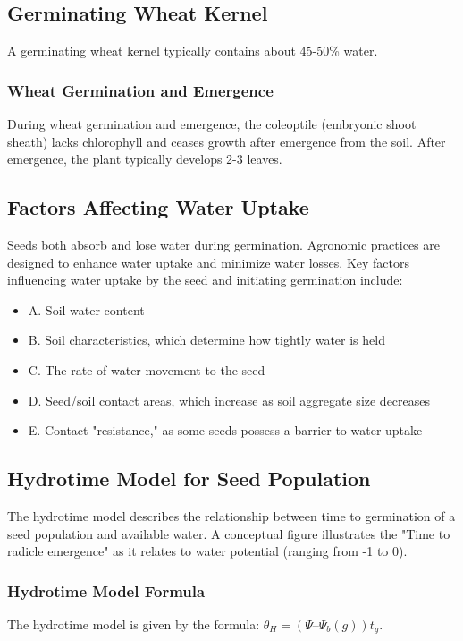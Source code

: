 \subsection{Germinating Wheat Kernel} 
A germinating wheat kernel typically contains about 45-50\% water.

\subsubsection{Wheat Germination and Emergence} 
During wheat germination and emergence, the coleoptile (embryonic shoot sheath) lacks chlorophyll and ceases growth after emergence from the soil. After emergence, the plant typically develops 2-3 leaves.

\subsection{Factors Affecting Water Uptake} 
Seeds both absorb and lose water during germination. Agronomic practices are designed to enhance water uptake and minimize water losses. Key factors influencing water uptake by the seed and initiating germination include: 

\begin{itemize} 
    \item A. Soil water content 
    \item B. Soil characteristics, which determine how tightly water is held 
    \item C. The rate of water movement to the seed 
    \item D. Seed/soil contact areas, which increase as soil aggregate size decreases 
    \item E. Contact "resistance," as some seeds possess a barrier to water uptake 
\end{itemize}

\subsection{Hydrotime Model for Seed Population} 
The hydrotime model describes the relationship between time to germination of a seed population and available water. A conceptual figure illustrates the "Time to radicle emergence" as it relates to water potential (ranging from -1 to 0).

\subsubsection{Hydrotime Model Formula} 
The hydrotime model is given by the formula: $\theta_H = (\Psi – \Psi_b(g))t_g$. 

